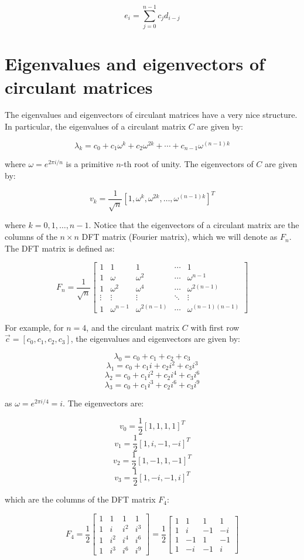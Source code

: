 $$e_i = \sum_{j=0}^{n-1} c_j d_{i-j}$$

\section{Eigenvalues and eigenvectors of circulant matrices}

The eigenvalues and eigenvectors of circulant matrices have a very nice structure. In particular, the
eigenvalues of a circulant matrix $C$ are given by:

$$\lambda_k = c_0 + c_1 \omega^k + c_2 \omega^{2k} + \cdots + c_{n-1} \omega^{(n-1)k}$$

where $\omega = e^{2 \pi i / n}$ is a primitive $n$-th root of unity. The eigenvectors of $C$ are given by:

$$v_k = \frac{1}{\sqrt{n}} [1, \omega^k, \omega^{2k}, \ldots, \omega^{(n-1)k}]^T$$

where $k = 0, 1, \ldots, n-1$. Notice that the eigenvectors of a circulant matrix are the columns of the
$n \times n$ DFT matrix (Fourier matrix), which we will denote as $F_n$. The DFT matrix is defined as:

$$F_n = \frac{1}{\sqrt{n}} \begin{bmatrix}
1 & 1 & 1 & \cdots & 1 \\
1 & \omega & \omega^2 & \cdots & \omega^{n-1} \\
1 & \omega^2 & \omega^4 & \cdots & \omega^{2(n-1)} \\
\vdots & \vdots & \vdots & \ddots & \vdots \\
1 & \omega^{n-1} & \omega^{2(n-1)} & \cdots & \omega^{(n-1)(n-1)}
\end{bmatrix}$$

For example, for $n = 4$, and the circulant matrix $C$ with first row $\vec{c} = [c_0, c_1, c_2, c_3]$, 
the eigenvalues and eigenvectors are given by:

$$\lambda_0 = c_0 + c_1 + c_2 + c_3$$
$$\lambda_1 = c_0 + c_1 i + c_2 i^2 + c_3 i^3$$
$$\lambda_2 = c_0 + c_1 i^2 + c_2 i^4 + c_3 i^6$$
$$\lambda_3 = c_0 + c_1 i^3 + c_2 i^6 + c_3 i^9$$

as $\omega = e^{2 \pi i / 4} = i$. The eigenvectors are:

$$v_0 = \frac{1}{2} [1, 1, 1, 1]^T$$
$$v_1 = \frac{1}{2} [1, i, -1, -i]^T$$
$$v_2 = \frac{1}{2} [1, -1, 1, -1]^T$$
$$v_3 = \frac{1}{2} [1, -i, -1, i]^T$$

which are the columns of the DFT matrix $F_4$:

$$F_4 = \frac{1}{2} \begin{bmatrix}
1 & 1 & 1 & 1 \\
1 & i & i^2 & i^3 \\
1 & i^2 & i^4 & i^6 \\
1 & i^3 & i^6 & i^9
\end{bmatrix} = \frac{1}{2} \begin{bmatrix}
1 & 1 & 1 & 1 \\
1 & i & -1 & -i \\
1 & -1 & 1 & -1 \\
1 & -i & -1 & i
\end{bmatrix}$$


